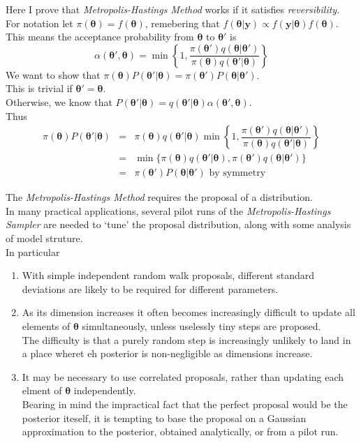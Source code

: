 \documentclass[11pt,a4paper]{article}
\begin{document}
Here I prove that \textit{Metropolis-Hastings Method} works if it satisfies \textit{reversibility}.\\
For notation let $\pi(\pmb\theta)=f(\pmb\theta)$, remebering that $f(\pmb\theta|\textbf{y})\propto f(\textbf{y}|\pmb\theta)f(\pmb\theta)$.\\
This means the acceptance probability from $\pmb\theta$ to $\pmb\theta'$ is
$$\alpha(\pmb\theta',\pmb\theta)=\min\left\{1,\dfrac{\pi(\pmb\theta')q(\pmb\theta|\pmb\theta')}{\pi(\pmb\theta)q(\pmb\theta'|\pmb\theta)}\right\}$$
We want to show that $\pi(\pmb\theta)P(\pmb\theta'|\pmb\theta)=\pi(\pmb\theta')P(\pmb\theta|\pmb\theta')$.\\
This is trivial if $\pmb\theta'=\pmb\theta$.\\
Otherwise, we know that $P(\pmb\theta'|\pmb\theta)=q(\pmb\theta'|\pmb\theta)\alpha(\pmb\theta',\pmb\theta)$.\\
Thus
\[\begin{array}{rcl}
\pi(\pmb\theta)P(\pmb\theta'|\pmb\theta)&=&\pi(\pmb\theta)q(\pmb\theta'|\pmb\theta)\min\left\{1,\dfrac{\pi(\pmb\theta')q(\pmb\theta|\pmb\theta')}{\pi(\pmb\theta)q(\pmb\theta'|\pmb\theta)}\right\}\\
&=&\min\{\pi(\pmb\theta)q(\pmb\theta'|\pmb\theta),\pi(\pmb\theta')q(\pmb\theta|\pmb\theta')\}\\
&=&\pi(\pmb\theta')P(\pmb\theta|\pmb\theta')\text{ by symmetry}
\end{array}\]

The \textit{Metropolis-Hastings Method} requires the proposal of a distribution.\\
In many practical applications, several pilot runs of the \textit{Metropolis-Hastings Sampler} are needed to `tune' the proposal distribution, along with some analysis of model struture.\\
In particular
\begin{enumerate}
	\item With simple independent random walk proposals, different standard deviations are likely to be required for different parameters.
	\item As its dimension increases it often becomes increasingly difficult to update all elements of $\pmb\theta$ simultaneously, unless uselessly tiny steps are proposed.\\
	The difficulty is that a purely random step is increasingly unlikely to land in a place wheret eh posterior is non-negligible as dimensions increase.
	\item It may be necessary to use correlated proposals, rather than updating each elment of $\pmb\theta$ independently.\\
	Bearing in mind the impractical fact that the perfect proposal would be the posterior iteself, it is tempting to base the proposal on a Gaussian approximation to the posterior, obtained analytically, or from a pilot run.
\end{enumerate}
\end{document}
